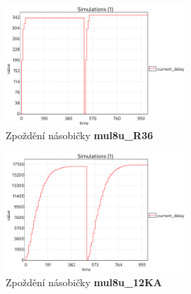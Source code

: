 \begin{figure}[H]
    \centering
    \includegraphics[width=0.6\textwidth]{obrazky-figures/delay_R36.png}
    \caption{Zpoždění násobičky \textbf{mul8u\_R36}}
    \label{fig:delay_R36}
\end{figure}

\begin{figure}[H]
    \centering
    \includegraphics[width=0.6\textwidth]{obrazky-figures/delay_12KA.png}
    \caption{Zpoždění násobičky \textbf{mul8u\_12KA}}
    \label{fig:delay_12KA}
\end{figure}

